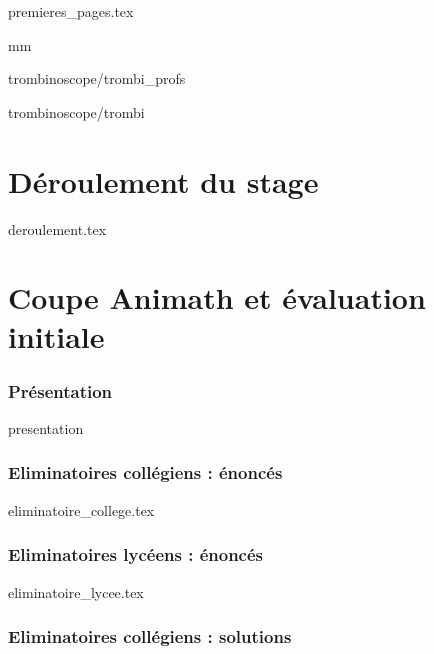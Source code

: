 \documentclass[12pt,A4]{book}
\theoremstyle{definition}
\theoremstyle{thm}
\theoremstyle{def}
\newcounter{sol}[subsection]
\begin{document}
{premieres_pages.tex}


\newcommand{\ssspas}{2cm}

\addtolength{\voffset}{-0.5cm}
 
  mm

\pagestyle {plain}


\footnotesize

 {trombinoscope/}{trombi_profs}

\pagestyle {plain}
\setlength{\tabcolsep}{6pt}

 {trombinoscope/}{trombi}

\normalsize
\pagestyle {empty}
\addtolength{\voffset}{+0.5cm}

\textheight 235mm

\tableofcontents

\chapter{Déroulement du stage}
\pagestyle {fancy}

{deroulement.tex}


\chapter{Coupe Animath et évaluation initiale}

\subsection{Présentation}

{presentation}

\subsection{Eliminatoires collégiens : énoncés}

{eliminatoire_college.tex}

\subsection{Eliminatoires lycéens : énoncés}

{eliminatoire_lycee.tex}

\subsection{Eliminatoires collégiens : solutions}
\end{document}
